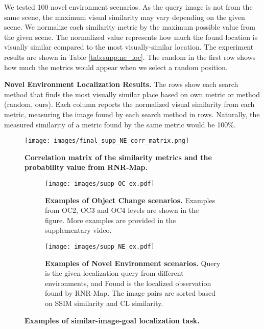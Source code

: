\documentclass[10pt,twocolumn,letterpaper]{article}
\begin{document}
%
We tested 100 novel environment scenarios.
%
As the query image is not from the same scene, the maximum visual similarity may vary depending on the given scene.
%
We normalize each similarity metric by the maximum possible value from the given scene.
%
The normalized value represents how much the found location is visually similar compared to the most visually-similar location.
%
The experiment results are shown in Table \ref{tab:supp:ne_loc}.
%
The random in the first row shows how much the metrics would appear when we select a random position.

\begin{table}[t]
\centering
\resizebox{0.8\linewidth}{!}{

}
\caption{\textbf{Novel Environment Localization Results.} The rows show each search method that finds the most visually similar place based on own metric or method (random, ours). Each column reports the normalized visual similarity from each metric, measuring the image found by each search method in rows.  
Naturally, the measured similarity of a metric found by the same metric would be 100\%. 
}\label{tab:supp:ne_loc}
\end{table}



\begin{figure}[t]
  \centering
  \texttt{[image: images/final\_supp\_NE\_corr\_matrix.png]}
  \caption{\textbf{Correlation matrix of the similarity metrics and the probability value from RNR-Map.}}%
\label{fig:supp:NE_corr}
\end{figure}
%


\begin{figure*}[t]
\centering
\begin{subfigure}{\textwidth}
  \centering
  \texttt{[image: images/supp\_OC\_ex.pdf]}
  \caption{\textbf{Examples of Object Change scenarios.} Examples from OC2, OC3 and OC4 levels are shown in the figure. More examples are provided in the supplementary video.}
\label{fig:supp:oc}
\end{subfigure}
\bigskip
\begin{subfigure}{\textwidth}
\centering
  \texttt{[image: images/supp\_NE\_ex.pdf]}
  \caption{\textbf{Examples of Novel Environment scenarios.} Query is the given localization query from different environments, and Found is the localized observation found by RNR-Map. The image pairs are sorted based on SSIM similarity and CL similarity.}
\label{fig:supp:NE}
\end{subfigure}
\caption{\textbf{Examples of similar-image-goal localization task.}}
\label{fig:supp:SIG}
\end{figure*}
\end{document}

